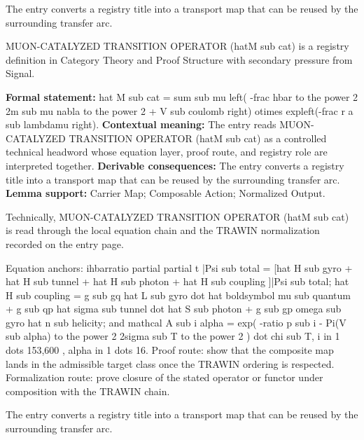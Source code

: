 The entry converts a registry title into a transport map that can be reused by the surrounding transfer arc.
\clearpage


\begingroup\small
{}
MUON-CATALYZED TRANSITION OPERATOR (hatM sub cat) is a registry definition in Category Theory and Proof Structure with secondary pressure from Signal.

\begingroup\footnotesize\setlength{\emergencystretch}{3em}\sloppy
\textbf{Formal statement:} hat M sub cat = sum sub mu left( -frac hbar to the power 2 2m sub mu nabla to the power 2 + V sub coulomb right) otimes expleft(-frac r a sub lambdamu right). \textbf{Contextual meaning:} The entry reads MUON-CATALYZED TRANSITION OPERATOR (hatM sub cat) as a controlled technical headword whose equation layer, proof route, and registry role are interpreted together. \textbf{Derivable consequences:} The entry converts a registry title into a transport map that can be reused by the surrounding transfer arc. \textbf{Lemma support:} Carrier Map; Composable Action; Normalized Output.\par
\endgroup

Technically, MUON-CATALYZED TRANSITION OPERATOR (hatM sub cat) is read through the local equation chain and the TRAWIN normalization recorded on the entry page.

Equation anchors: ihbarratio partial partial t |Psi sub total = [hat H sub gyro + hat H sub tunnel + hat H sub photon + hat H sub coupling ]|Psi sub total; hat H sub coupling = g sub gq hat L sub gyro dot hat boldsymbol mu sub quantum + g sub qp hat sigma sub tunnel dot hat S sub photon + g sub gp omega sub gyro hat n sub helicity; and mathcal A sub i alpha = exp( -ratio p sub i - Pi(V sub alpha) to the power 2 2sigma sub T to the power 2 ) dot chi sub T, i in 1 dots 153,600 , alpha in 1 dots 16. Proof route: show that the composite map lands in the admissible target class once the TRAWIN ordering is respected. Formalization route: prove closure of the stated operator or functor under composition with the TRAWIN chain.

The entry converts a registry title into a transport map that can be reused by the surrounding transfer arc.
\endgroup

